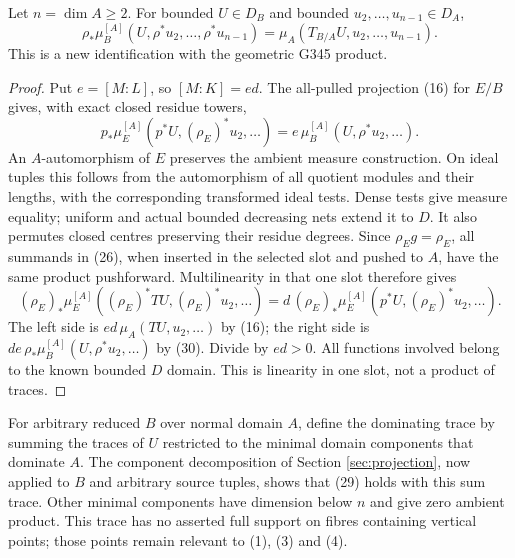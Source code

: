 \begin{theorem}
Let \(n=\dim A\geq2\). For bounded \(U\in D_B\) and bounded
\(u_2,\ldots,u_{n-1}\in D_A\),
\[
 \rho_*\mu_B^{[A]}(U,\rho^*u_2,\ldots,\rho^*u_{n-1})
       =\mu_A(T_{B/A}U,u_2,\ldots,u_{n-1}).                    \tag{29}
\]
This is a new identification with the geometric G345 product.
\end{theorem}
\begin{proof}
Put \(e=[M:L]\), so \([M:K]=ed\).
The all-pulled projection (16) for \(E/B\) gives, with exact
closed residue towers,
\[
 p_*\mu_E^{[A]}(p^*U,(\rho_E)^*u_2,\ldots)
                 =e\,\mu_B^{[A]}(U,\rho^*u_2,\ldots).        \tag{30}
\]
An \(A\)-automorphism of \(E\) preserves the ambient measure
construction. On ideal tuples this follows from the
automorphism of all quotient modules and their lengths, with
the corresponding transformed ideal tests. Dense tests give
measure equality; uniform and actual bounded decreasing nets
extend it to \(D\). It also permutes closed centres preserving
their residue degrees. Since \(\rho_Eg=\rho_E\), all summands
in (26), when inserted in the selected slot and pushed to \(A\),
have the same product pushforward.
Multilinearity in that one slot therefore gives
\[
 (\rho_E)_*\mu_E^{[A]}((\rho_E)^*TU,(\rho_E)^*u_2,\ldots)
    =d\,(\rho_E)_*\mu_E^{[A]}(p^*U,(\rho_E)^*u_2,\ldots).
                                                               \tag{31}
\]
The left side is \(ed\,\mu_A(TU,u_2,\ldots)\) by (16);
the right side is \(de\,\rho_*\mu_B^{[A]}(U,\rho^*u_2,\ldots)\)
by (30). Divide by \(ed>0\).
All functions involved belong to the known bounded \(D\)
domain. This is linearity in one slot, not a product of traces.
\end{proof}

For arbitrary reduced \(B\) over normal domain \(A\), define
the dominating trace by summing the traces of \(U\) restricted
to the minimal domain components that dominate \(A\).
The component decomposition of Section \ref{sec:projection},
now applied to \(B\) and arbitrary source tuples, shows that
(29) holds with this sum trace. Other minimal components have
dimension below \(n\) and give zero ambient product.
This trace has no asserted full support on fibres containing
vertical points; those points remain relevant to (1), (3)
and (4).

